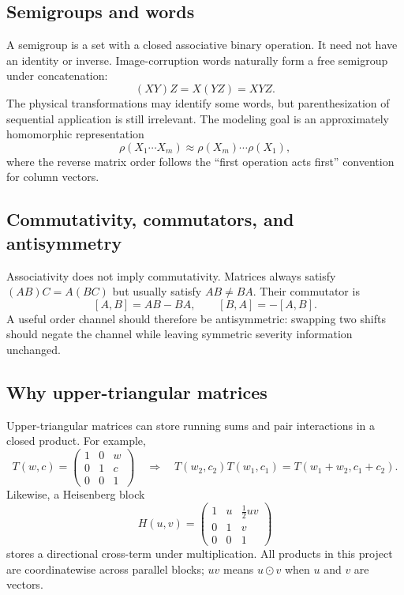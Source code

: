 \documentclass[11pt,a4paper]{article}
\newcommand{\od}{\odot}
\begin{document}
\subsection{Semigroups and words}

A semigroup is a set with a closed associative binary operation.  It need not
have an identity or inverse.  Image-corruption words naturally form a free
semigroup under concatenation:
\[
(XY)Z=X(YZ)=XYZ.
\]
The physical transformations may identify some words, but parenthesization of
sequential application is still irrelevant.  The modeling goal is an
approximately homomorphic representation
\[
\rho(X_1\cdots X_m)\approx \rho(X_m)\cdots\rho(X_1),
\]
where the reverse matrix order follows the ``first operation acts first''
convention for column vectors.

\subsection{Commutativity, commutators, and antisymmetry}

Associativity does not imply commutativity.  Matrices always satisfy
$(AB)C=A(BC)$ but usually satisfy $AB\ne BA$.  Their commutator is
\[
[A,B]=AB-BA,
\qquad [B,A]=-[A,B].
\]
A useful order channel should therefore be antisymmetric: swapping two shifts
should negate the channel while leaving symmetric severity information
unchanged.

\subsection{Why upper-triangular matrices}

Upper-triangular matrices can store running sums and pair interactions in a
closed product.  For example,
\[
T(w,c)=
\begin{pmatrix}1&0&w\\0&1&c\\0&0&1\end{pmatrix}
\quad\Longrightarrow\quad
T(w_2,c_2)T(w_1,c_1)=T(w_1+w_2,c_1+c_2).
\]
Likewise, a Heisenberg block
\begin{equation}
H(u,v)=
\begin{pmatrix}
1&u&\tfrac12uv\\
0&1&v\\
0&0&1
\end{pmatrix}
\label{eq:heis}
\end{equation}
stores a directional cross-term under multiplication.  All products in this
project are coordinatewise across parallel blocks; $uv$ means $u\od v$ when
$u$ and $v$ are vectors.
\end{document}
